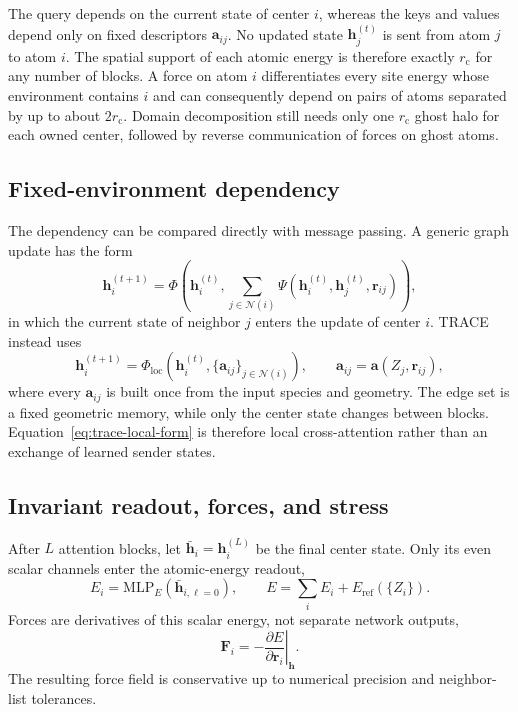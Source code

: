 \documentclass[aps,prx,preprint,notitlepage,superscriptaddress,nofootinbib,floatfix]{revtex4-2}
\newcommand{\calN}{\mathcal{N}}
\newcommand{\vect}[1]{\bm{#1}}
\begin{document}
The query depends on the current state of center $i$, whereas
the keys and values depend only on fixed descriptors $\vect a_{ij}$. No updated
state $\vect h_j^{(t)}$ is sent from atom $j$ to atom $i$. The spatial support of
each atomic energy is therefore exactly $r_{\mathrm c}$ for any number of
blocks. A force on atom $i$ differentiates every site energy whose environment
contains $i$ and can consequently depend on pairs of atoms separated by up to
about $2r_{\mathrm c}$. Domain decomposition still needs only one
$r_{\mathrm c}$ ghost halo for each owned center, followed by reverse
communication of forces on ghost atoms.

\subsection{Fixed-environment dependency}

The dependency can be compared directly with message passing.
A generic graph update has the form
\begin{equation}
 \vect h_i^{(t+1)}
 =\Phi\!\left(\vect h_i^{(t)},
 \sum_{j\in\calN(i)}
 \Psi(\vect h_i^{(t)},\vect h_j^{(t)},\vect r_{ij})\right),
 \label{eq:message-passing-form}
\end{equation}
in which the current state of neighbor $j$ enters the update
of center $i$. TRACE instead uses
\begin{equation}
 \vect h_i^{(t+1)}
 =\Phi_{\mathrm{loc}}\!\left(
 \vect h_i^{(t)},
 \{\vect a_{ij}\}_{j\in\calN(i)}\right),
 \qquad
 \vect a_{ij}=\vect a(Z_j,\vect r_{ij}),
 \label{eq:trace-local-form}
\end{equation}
where every $\vect a_{ij}$ is built once from the input
species and geometry. The edge set is a fixed geometric memory, while only the center state changes between blocks. Equation~\eqref{eq:trace-local-form} is therefore local cross-attention rather than an exchange of learned sender states.

\subsection{Invariant readout, forces, and stress}

After $L$ attention blocks, let
$\bar{\vect h}_i=\vect h_i^{(L)}$ be the final center state. Only its even scalar
channels enter the atomic-energy readout,
\begin{equation}
 E_i=\mathrm{MLP}_{E}\!\left(\bar{\vect h}_{i,\ell=0}\right),
 \qquad E=\sum_iE_i+E_{\mathrm{ref}}(\{Z_i\}).
 \label{eq:energy}
\end{equation}
Forces are derivatives of this scalar energy, not separate
network outputs,
\begin{equation}
 \vect F_i=-\left.\frac{\partial E}{\partial\vect r_i}\right|_{\vect h}.
 \label{eq:force}
\end{equation}
The resulting force field is conservative up to numerical
precision and neighbor-list tolerances.
\end{document}
